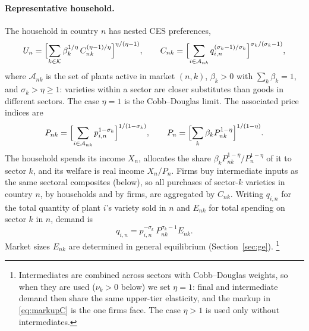 \documentclass[11pt]{article}
\theoremstyle{definition}
\theoremstyle{remark}
\newcommand{\cK}{\mathcal K}
\newcommand{\cA}{\mathcal A}
\begin{document}
\paragraph{Representative household.} The household in country $n$ has nested CES
preferences,
\begin{equation}
  U_n=\Bigl[\sum_{k\in\cK}\beta_k^{1/\eta}\,C_{nk}^{(\eta-1)/\eta}\Bigr]^{\eta/(\eta-1)},
  \qquad
  C_{nk}=\Bigl[\sum_{i\in\cA_{nk}}q_{i,n}^{(\sigma_k-1)/\sigma_k}\Bigr]^{\sigma_k/(\sigma_k-1)},
  \label{eq:utility}
\end{equation}
where $\cA_{nk}$ is the set of plants active in market $(n,k)$, $\beta_k>0$ with
$\sum_k\beta_k=1$, and $\sigma_k>\eta\ge1$: varieties within a sector are closer
substitutes than goods in different sectors. The case $\eta=1$ is the Cobb--Douglas
limit. The associated price indices are
\begin{equation}
  P_{nk}=\Bigl[\sum_{i\in\cA_{nk}}p_{i,n}^{1-\sigma_k}\Bigr]^{1/(1-\sigma_k)},
  \qquad
  P_n=\Bigl[\sum_{k}\beta_k P_{nk}^{1-\eta}\Bigr]^{1/(1-\eta)} .
  \label{eq:priceindex}
\end{equation}
The household spends its income $X_n$, allocates the share
$\beta_kP_{nk}^{1-\eta}/P_n^{1-\eta}$ of it to sector $k$, and its welfare is real
income $X_n/P_n$. Firms buy intermediate inputs as the same sectoral composites (below), so
all purchases of sector-$k$ varieties in country $n$, by households and by firms, are
aggregated by $C_{nk}$. Writing $q_{i,n}$ for the total quantity of plant $i$'s
variety sold in $n$ and $E_{nk}$ for total spending on sector $k$ in $n$, demand is
\begin{equation}
  q_{i,n}=p_{i,n}^{-\sigma_k}\,P_{nk}^{\sigma_k-1}E_{nk}.
  \label{eq:demand}
\end{equation}
Market sizes $E_{nk}$ are determined in general equilibrium (Section~\ref{sec:ge}).%
\footnote{Intermediates are combined across sectors with Cobb--Douglas weights, so
when they are used ($\nu_k>0$ below) we set $\eta=1$: final and intermediate demand
then share the same upper-tier elasticity, and the markup in \eqref{eq:markupC} is the
one firms face. The case $\eta>1$ is used only without intermediates.}
\end{document}
